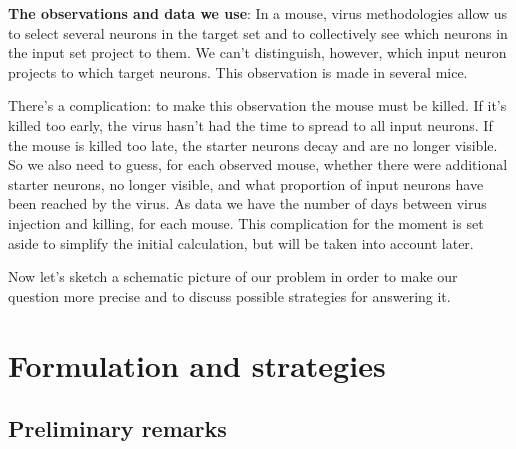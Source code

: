 \documentclass[\ifafour a4paper,12pt,\else a5paper,10pt,\fi%
onecolumn,oneside,article,%
british%
]{memoir}
\theoremstyle{remark}
\theoremstyle{innote}
\renewcommand*{\|}[1][]{\nonscript\,#1\vert\nonscript\;\mathopen{}}
\begin{document}
\medskip

\textbf{The observations and data we use}: In a mouse, virus methodologies
allow us to select several neurons in the target set and to collectively
see which neurons in the input set project to them. We can't distinguish,
however, which input neuron projects to which target neurons. This
observation is made in several mice.

There's a complication: to make this observation the mouse must be killed.
If it's killed too early, the virus hasn't had the time to spread to all
input neurons. If the mouse is killed too late, the starter neurons decay
and are no longer visible. So we also need to guess, for each observed
mouse, whether there were additional starter neurons, no longer visible,
and what proportion of input neurons have been reached by the virus. As
data we have the number of days between virus injection and killing, for
each mouse. This complication for the moment is set aside to simplify the
initial calculation, but will be taken into account later.

\medskip

Now let's sketch a schematic picture of our problem in order to make our
question more precise and to discuss possible strategies for answering it.

\section{Formulation and strategies}
\label{sec:strategies}

\setcounter{subsection}{-1}
\subsection{Preliminary remarks}
\label{sec:prelim_remarks}
\end{document}
